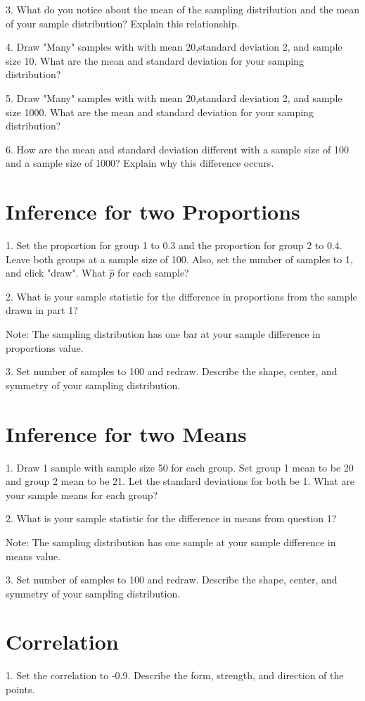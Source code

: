 \documentclass[11pt]{amsart}
\begin{document}
3.  What do you notice about the mean of the sampling distribution and the mean of your sample distribution? Explain this relationship. 

4. Draw "Many" samples with with mean 20,standard deviation 2, and sample size 10. What are the mean and standard deviation for your samping distribution?

5. Draw "Many" samples with with mean 20,standard deviation 2, and sample size 1000. What are the mean and standard deviation for your samping distribution?

6. How are the mean and standard deviation different with a sample size of 100 and a sample size of 1000? Explain why this difference occurs. 


\section{Inference for two Proportions}

1. Set the proportion for group 1 to 0.3 and the proportion for group 2 to 0.4. Leave both groups at a sample size of 100. Also, set the number of samples to 1, and click "draw". What $\hat{p}$ for each sample? 

2. What is your sample statistic for the difference in proportions from the sample drawn in part 1?


Note: The sampling distribution has one bar at your sample difference in proportions value.

3. Set number of samples to 100 and redraw. Describe the shape, center, and symmetry of your sampling distribution. 


\section{Inference for two Means}
1. Draw 1 sample with sample size 50 for each group. Set group 1 mean to be 20 and group 2 mean to be 21.  Let the standard deviations for both be 1. What are your sample means for each group?

2. What is your sample statistic for the difference in means from question 1?


Note: The sampling distribution has one sample at your sample difference in means value.

3. Set number of samples to 100 and redraw. Describe the shape, center, and symmetry of your sampling distribution. 




\section{Correlation}
1. Set the correlation to -0.9. Describe the form, strength, and direction of the points.
\end{document}
